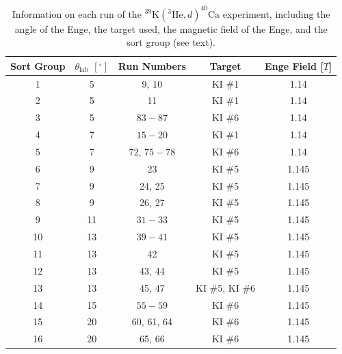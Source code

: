 \begin{table}[t]
\centering
\caption{\label{tab:run}Information on each run of the $^{39}\mathrm{K}(^{3}\mathrm{He}, d)^{40}\mathrm{Ca}$ experiment, including the angle of the Enge, the target used, the magnetic field of the Enge, and the sort group (see text).}
\begin{tabular}{ccccc}
\hline\midrule
Sort Group&$\theta_{\mathrm{lab}}$ $[^{\circ}]$&Run Numbers&Target&Enge Field [$T$]\\ \midrule
1&5&9, 10&KI $\#$1&1.14\\
2&5&11&KI $\#$1&1.14\\
3&5&$83-87$&KI $\#$6&1.14\\
4&7&$15-20$&KI $\#$1&1.14\\
5&7&72, $75-78$&KI $\#$6&1.14\\
6&9&23&KI $\#$5&1.145\\
7&9&24, 25&KI $\#$5&1.145\\
8&9&26, 27&KI $\#$5&1.145\\
9&11&$31-33$&KI $\#$5&1.145\\
10&13&$39-41$&KI $\#$5&1.145\\
11&13&42&KI $\#$5&1.145\\
12&13&43, 44&KI $\#$5&1.145\\
13&13&45, 47&KI $\#$5, KI $\#$6&1.145\\
14&15&$55-59$&KI $\#$6&1.145\\
15&20&60, 61, 64&KI $\#$6&1.145\\
16&20&65, 66&KI $\#$6&1.145\\
\hline\hline
\end{tabular}
\end{table}

